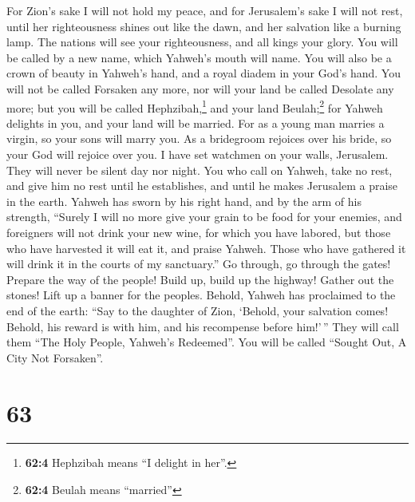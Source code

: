  For Zion's sake I will not hold my peace, and for
Jerusalem's sake I will not rest, until her righteousness shines out
like the dawn, and her salvation like a burning lamp.  The
nations will see your righteousness, and all kings your glory. You will
be called by a new name, which Yahweh's mouth will name. 
You will also be a crown of beauty in Yahweh's hand, and a royal diadem
in your God's hand.  You will not be called Forsaken any
more, nor will your land be called Desolate any more; but you will be
called Hephzibah,\footnote{\textbf{62:4} Hephzibah means ``I delight in
  her''.} and your land Beulah;\footnote{\textbf{62:4} Beulah means
  ``married''} for Yahweh delights in you, and your land will be
married.  For as a young man marries a virgin, so your
sons will marry you. As a bridegroom rejoices over his bride, so your
God will rejoice over you.  I have set watchmen on your
walls, Jerusalem. They will never be silent day nor night. You who call
on Yahweh, take no rest,  and give him no rest until he
establishes, and until he makes Jerusalem a praise in the earth.
 Yahweh has sworn by his right hand, and by the arm of his
strength, ``Surely I will no more give your grain to be food for your
enemies, and foreigners will not drink your new wine, for which you have
labored,  but those who have harvested it will eat it, and
praise Yahweh. Those who have gathered it will drink it in the courts of
my sanctuary.''  Go through, go through the gates!
Prepare the way of the people! Build up, build up the highway! Gather
out the stones! Lift up a banner for the peoples. 
Behold, Yahweh has proclaimed to the end of the earth: ``Say to the
daughter of Zion, `Behold, your salvation comes! Behold, his reward is
with him, and his recompense before him!'\,''  They will
call them ``The Holy People, Yahweh's Redeemed''. You will be called
``Sought Out, A City Not Forsaken''.

\hypertarget{section-60}{%
\section{63}\label{section-60}}

